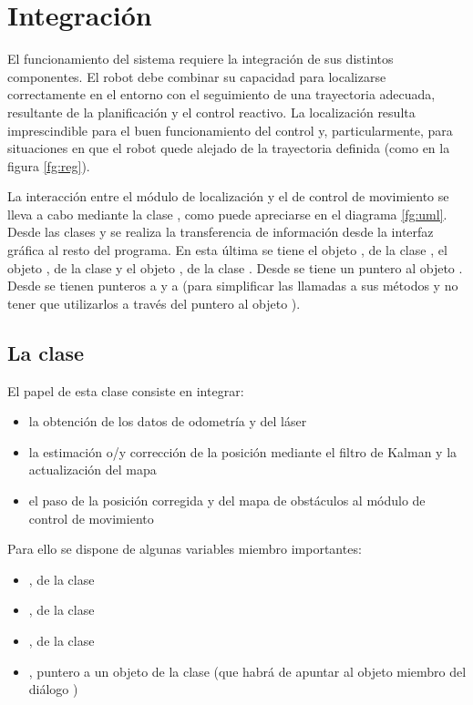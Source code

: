 
\chapter{Integración}
El funcionamiento del sistema requiere la integración de sus distintos componentes. El robot debe combinar su capacidad para localizarse correctamente en el entorno con el seguimiento de una trayectoria adecuada, resultante de la planificación y el control reactivo. La localización resulta imprescindible para el buen funcionamiento del control y, particularmente, para situaciones en que el robot quede alejado de la trayectoria definida (como en la figura \ref{fg:reg}).

La interacción entre el módulo de localización y el de control de movimiento se lleva a cabo mediante la clase , como puede apreciarse en el diagrama \ref{fg:uml}. Desde las clases  y  se realiza la transferencia de información desde la interfaz gráfica al resto del programa. En esta última se tiene el objeto , de la clase , el objeto , de la clase  y el objeto , de la clase . Desde  se tiene un puntero al objeto . Desde  se tienen punteros a   y a  (para simplificar las llamadas a sus métodos y no tener que utilizarlos a través del puntero al objeto ).

\section{La clase }
El papel de esta clase consiste en integrar:
\begin{itemize}
  \item la obtención de los datos de odometría y del láser
  \item la estimación o/y corrección de la posición mediante el filtro de Kalman y la actualización del mapa
  \item el paso de la posición corregida y del mapa de obstáculos al módulo de control de movimiento
\end{itemize}

Para ello se dispone de algunas variables miembro importantes:
\begin{itemize}
  \item {}, de la clase 
  \item {}, de la clase 
  \item {}, de la clase 
  \item {}, puntero a un objeto de la clase  (que habrá de apuntar al objeto  miembro del diálogo )
\end{itemize}

